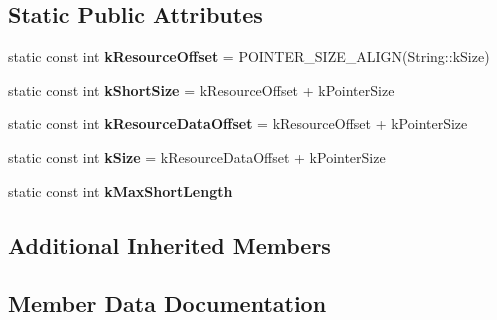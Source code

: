 \subsection*{Static Public Attributes}
\begin{DoxyCompactItemize}
\item 
\hypertarget{classv8_1_1internal_1_1_external_string_ac5251d51ad59028573e1e5f8e534318a}{}static const int {\bfseries k\+Resource\+Offset} = P\+O\+I\+N\+T\+E\+R\+\_\+\+S\+I\+Z\+E\+\_\+\+A\+L\+I\+G\+N(String\+::k\+Size)\label{classv8_1_1internal_1_1_external_string_ac5251d51ad59028573e1e5f8e534318a}

\item 
\hypertarget{classv8_1_1internal_1_1_external_string_abb06b1e195bf54477442ee1b79c535db}{}static const int {\bfseries k\+Short\+Size} = k\+Resource\+Offset + k\+Pointer\+Size\label{classv8_1_1internal_1_1_external_string_abb06b1e195bf54477442ee1b79c535db}

\item 
\hypertarget{classv8_1_1internal_1_1_external_string_a4348137b1eb1eb30d93dea886db3b572}{}static const int {\bfseries k\+Resource\+Data\+Offset} = k\+Resource\+Offset + k\+Pointer\+Size\label{classv8_1_1internal_1_1_external_string_a4348137b1eb1eb30d93dea886db3b572}

\item 
\hypertarget{classv8_1_1internal_1_1_external_string_a461b89e75b8747480b89e871ab38a3fb}{}static const int {\bfseries k\+Size} = k\+Resource\+Data\+Offset + k\+Pointer\+Size\label{classv8_1_1internal_1_1_external_string_a461b89e75b8747480b89e871ab38a3fb}

\item 
static const int {\bfseries k\+Max\+Short\+Length}
\end{DoxyCompactItemize}
\subsection*{Additional Inherited Members}


\subsection{Member Data Documentation}
\hypertarget{classv8_1_1internal_1_1_external_string_a30d05419acd085c38505ab284e04e69b}{}
